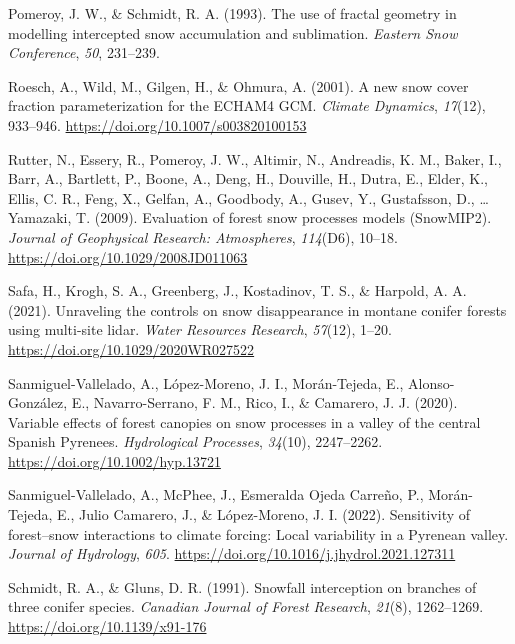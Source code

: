 \documentclass[
]{agujournal2019}
\newlength{\cslhangindent}
\newenvironment{CSLReferences}[2] %
 {\begin{list}{}{%
  \setlength{\itemindent}{0pt}
  \setlength{\leftmargin}{0pt}
  \setlength{\parsep}{0pt}
  \ifodd #1
   \setlength{\leftmargin}{\cslhangindent}
   \setlength{\itemindent}{-1\cslhangindent}
  \fi
  \setlength{\itemsep}{#2\baselineskip}}}
 {\end{list}}
\begin{document}
\begin{CSLReferences}{1}{0}
Pomeroy, J. W., \& Schmidt, R. A. (1993). The use of fractal geometry in
modelling intercepted snow accumulation and sublimation. \emph{Eastern
Snow Conference}, \emph{50}, 231--239.

Roesch, A., Wild, M., Gilgen, H., \& Ohmura, A. (2001). A new snow cover
fraction parameterization for the {ECHAM4 GCM}. \emph{Climate Dynamics},
\emph{17}(12), 933--946. \url{https://doi.org/10.1007/s003820100153}

Rutter, N., Essery, R., Pomeroy, J. W., Altimir, N., Andreadis, K. M.,
Baker, I., Barr, A., Bartlett, P., Boone, A., Deng, H., Douville, H.,
Dutra, E., Elder, K., Ellis, C. R., Feng, X., Gelfan, A., Goodbody, A.,
Gusev, Y., Gustafsson, D., \ldots{} Yamazaki, T. (2009). Evaluation of
forest snow processes models ({SnowMIP2}). \emph{Journal of Geophysical
Research: Atmospheres}, \emph{114}(D6), 10--18.
\url{https://doi.org/10.1029/2008JD011063}

Safa, H., Krogh, S. A., Greenberg, J., Kostadinov, T. S., \& Harpold, A.
A. (2021). Unraveling the controls on snow disappearance in montane
conifer forests using multi-site lidar. \emph{Water Resources Research},
\emph{57}(12), 1--20. \url{https://doi.org/10.1029/2020WR027522}

Sanmiguel-Vallelado, A., López-Moreno, J. I., Morán-Tejeda, E.,
Alonso-González, E., Navarro-Serrano, F. M., Rico, I., \& Camarero, J.
J. (2020). Variable effects of forest canopies on snow processes in a
valley of the central {Spanish Pyrenees}. \emph{Hydrological Processes},
\emph{34}(10), 2247--2262. \url{https://doi.org/10.1002/hyp.13721}

Sanmiguel-Vallelado, A., McPhee, J., Esmeralda Ojeda Carreño, P.,
Morán-Tejeda, E., Julio Camarero, J., \& López-Moreno, J. I. (2022).
Sensitivity of forest--snow interactions to climate forcing: {Local}
variability in a {Pyrenean} valley. \emph{Journal of Hydrology},
\emph{605}. \url{https://doi.org/10.1016/j.jhydrol.2021.127311}

Schmidt, R. A., \& Gluns, D. R. (1991). Snowfall interception on
branches of three conifer species. \emph{Canadian Journal of Forest
Research}, \emph{21}(8), 1262--1269.
\url{https://doi.org/10.1139/x91-176}


\end{CSLReferences}
\end{document}

